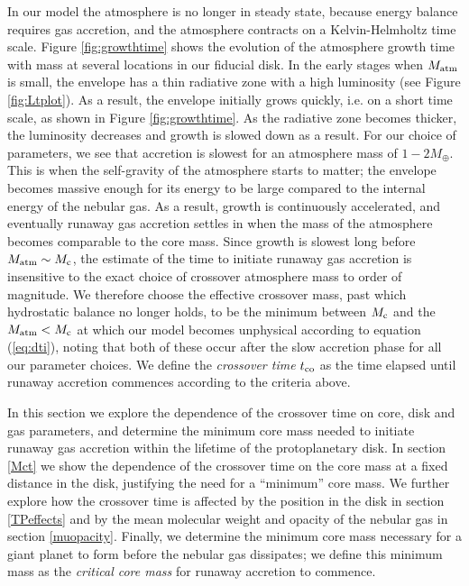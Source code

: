 \documentclass[apj]{emulateapj}
\begin{document}
In our model the atmosphere is no longer in steady state, because energy balance requires gas accretion, and the atmosphere contracts on a Kelvin-Helmholtz time scale. Figure \ref{fig:growthtime} shows the evolution of the atmosphere growth time with mass at several locations in our fiducial disk. In the early stages when $M_{\rm{atm}}$ is small, the envelope has a thin radiative zone with a high luminosity (see Figure \ref{fig:Ltplot}). As a result, the envelope initially grows quickly, i.e. on a short time scale, as shown in Figure \ref{fig:growthtime}. As the radiative zone becomes thicker, the luminosity decreases and growth is slowed down as a result. For our choice of parameters, we see that accretion is slowest for an atmosphere mass of $1-2 M_{\oplus}$. This is when the self-gravity of the atmosphere starts to matter; the envelope becomes massive enough for its energy to be large compared to the internal energy of the nebular gas. As a result, growth is continuously accelerated, and eventually runaway gas accretion settles in when the mass of the atmosphere becomes comparable to the core mass. Since growth is slowest long before $M_{\rm{atm}} \sim M_{\rm c}$, the estimate of the time to initiate runaway gas accretion is insensitive to the exact choice of crossover atmosphere mass to order of magnitude. We therefore choose the effective crossover mass, past which hydrostatic balance no longer holds, to be the minimum between $M_{\rm{c}}$ and the $M_{\rm{atm}}<M_{\rm c}$ at which our model becomes unphysical according to equation (\ref{eq:dti}), noting that both of these occur after the slow accretion phase for all our parameter choices. We define the \textit{crossover time} $t_{\rm{co}}$ as the time elapsed until runaway accretion commences according to the criteria above.

In this section we explore the dependence of the crossover time on core, disk and gas parameters, and determine the minimum core mass needed to initiate runaway gas accretion within the lifetime of the protoplanetary disk. In section \ref{Mct} we show the dependence of the crossover time on the core mass at a fixed distance in the disk, justifying the need for a ``minimum'' core mass. We further explore how the crossover time is affected by the position in the disk in section \ref{TPeffects} and by the mean molecular weight and opacity of the nebular gas in section \ref{muopacity}. Finally, we determine the minimum core mass necessary for a giant planet to form before the nebular gas dissipates; we define this minimum mass as the \textit{critical core mass} for runaway accretion to commence. 
\end{document}
